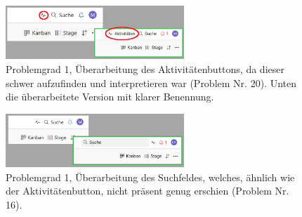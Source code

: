 \begin{figure}[h]
    \includegraphics[width=0.6\textwidth]{images/Verbesserungsvorschlaege/zenkitActivities.png}
    \centering
    \caption{Problemgrad 1, Überarbeitung des Aktivitätenbuttons, da dieser schwer aufzufinden und interpretieren war (Problem Nr. 20). Unten die überarbeitete Version mit klarer Benennung.}
    \label{fig:zenkitaktivit}
\end{figure}

\begin{figure}[h]   
    \includegraphics[width=0.6\textwidth]{images/Verbesserungsvorschlaege/zenkitSuche.png}
    \centering
    \caption{Problemgrad 1, Überarbeitung des Suchfeldes, welches, ähnlich wie der Aktivitätenbutton, nicht präsent genug erschien (Problem Nr. 16).}
    \label{fig:zenkitsuche}
\end{figure}

\FloatBarrier